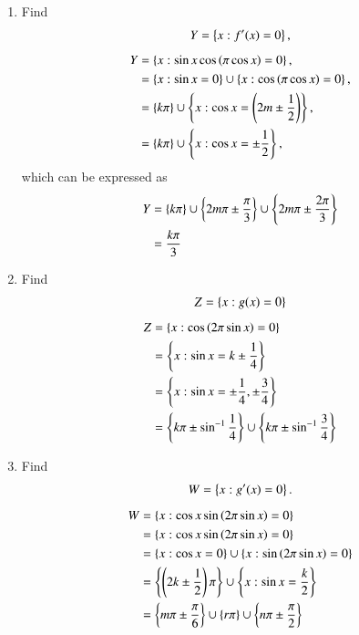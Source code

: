 \documentclass[journal,12pt,twocolumn]{IEEEtran}
\renewcommand\thesection{\arabic{section}}
\begin{document}
\begin{enumerate}[label=\thesection.\arabic*
,ref=\thesection.\theenumi]
\item Find
\begin{align}
 Y = \left\{x: f^{\prime}(x) = 0\right\},
\end{align}
\solution 
\begin{align}
 Y &= \left\{x: \sin x\cos\left(\pi \cos x\right) = 0\right\},
\nonumber \\
&= \left\{x: \sin x = 0\right\} \cup  \left\{x: \cos\left(\pi \cos x\right) = 0\right\},
\nonumber \\
&= \left\{k\pi\right\} \cup  \left\{x:  \cos x =\left(2m\pm \frac{1}{2}\right) \right\},
\nonumber \\
&= \left\{k\pi\right\} \cup  \left\{x:  \cos x =\pm \frac{1}{2}\right\},
\end{align}
%
which can be expressed as 
\begin{align}
Y&= \left\{k\pi\right\} \cup  \left\{2m\pi \pm \frac{\pi}{3}\right\}\cup \left\{2m\pi \pm \frac{2\pi}{3}\right\}
\nonumber \\
&= \frac{k\pi}{3}
\end{align}
\item Find
\begin{align}
Z = \left\{x: g(x) = 0\right\}
\end{align}
\solution 
\begin{align}
Z &= \left\{x: \cos\left(2\pi \sin x\right)= 0\right\}
\nonumber \\
&= \left\{x:  \sin x= k\pm \frac{1}{4}\right\}
\nonumber \\
&= \left\{x:  \sin x= \pm \frac{1}{4}, \pm \frac{3}{4} \right\}
\nonumber \\
&= \left\{ k\pi \pm \sin ^{-1}\frac{1}{4}\right\}\cup \left\{ k\pi \pm \sin ^{-1}\frac{3}{4} \right\}
\end{align}
\item Find
\begin{align}
 W = \left\{x: g^{\prime}(x) = 0\right\}.
\end{align}
\solution 
\begin{align}
 W &= \left\{x: \cos x\sin\left(2\pi \sin x\right)= 0\right\}
\nonumber \\
&= \left\{x: \cos x\sin\left(2\pi \sin x\right)= 0\right\}
\nonumber \\
&= \left\{x: \cos x= 0\right\}\cup \left\{x: \sin\left(2\pi \sin x\right)=0\right\}
\nonumber \\
&= \left\{\left(2k \pm \frac{1}{2}\right)\pi\right\}\cup \left\{x:  \sin x=\frac{k}{2}\right\}
\nonumber \\
&=  \left\{m\pi \pm \frac{\pi}{6}\right\}
\cup \left\{r\pi\right\}\cup \left\{n\pi \pm \frac{\pi}{2}\right\}
\end{align}
\end{enumerate}
\end{document}
